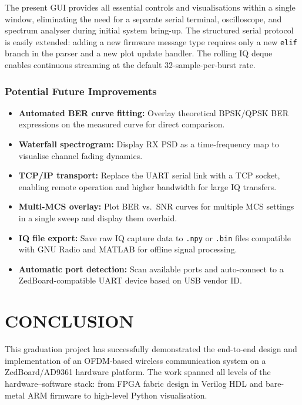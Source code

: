 \documentclass[12pt, a4paper, oneside]{report}
\begin{document}
The present GUI provides all essential controls and visualisations within a single window, eliminating the need for a separate serial terminal, oscilloscope, and spectrum analyser during initial system bring-up. The structured serial protocol is easily extended: adding a new firmware message type requires only a new \texttt{elif} branch in the parser and a new plot update handler. The rolling IQ deque enables continuous streaming at the default 32-sample-per-burst rate.

\subsection{Potential Future Improvements}

\begin{itemize}[noitemsep]
  \item \textbf{Automated BER curve fitting:} Overlay theoretical BPSK/QPSK BER expressions on the measured curve for direct comparison.
  \item \textbf{Waterfall spectrogram:} Display RX PSD as a time-frequency map to visualise channel fading dynamics.
  \item \textbf{TCP/IP transport:} Replace the UART serial link with a TCP socket, enabling remote operation and higher bandwidth for large IQ transfers.
  \item \textbf{Multi-MCS overlay:} Plot BER vs.\ SNR curves for multiple MCS settings in a single sweep and display them overlaid.
  \item \textbf{IQ file export:} Save raw IQ capture data to \texttt{.npy} or \texttt{.bin} files compatible with GNU Radio and MATLAB for offline signal processing.
  \item \textbf{Automatic port detection:} Scan available ports and auto-connect to a ZedBoard-compatible UART device based on USB vendor ID.
\end{itemize}

\chapter*{CONCLUSION}

This graduation project has successfully demonstrated the end-to-end design and implementation of an OFDM-based wireless communication system on a ZedBoard/AD9361 hardware platform. The work spanned all levels of the hardware–software stack: from FPGA fabric design in Verilog HDL and bare-metal ARM firmware to high-level Python visualisation.
\end{document}
